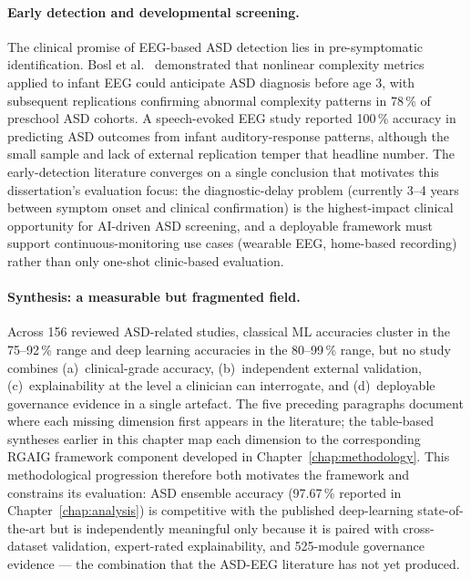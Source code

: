 \paragraph{Early detection and developmental screening.}
The clinical promise of EEG-based ASD detection lies in pre-symptomatic identification. Bosl et al.~\cite{bosl2018eeg} demonstrated that nonlinear complexity metrics applied to infant EEG could anticipate ASD diagnosis before age 3, with subsequent replications confirming abnormal complexity patterns in 78\,\% of preschool ASD cohorts. A speech-evoked EEG study reported 100\,\% accuracy in predicting ASD outcomes from infant auditory-response patterns, although the small sample and lack of external replication temper that headline number. The early-detection literature converges on a single conclusion that motivates this dissertation's evaluation focus: the diagnostic-delay problem (currently 3--4 years between symptom onset and clinical confirmation) is the highest-impact clinical opportunity for AI-driven ASD screening, and a deployable framework must support continuous-monitoring use cases (wearable EEG, home-based recording) rather than only one-shot clinic-based evaluation.

\paragraph{Synthesis: a measurable but fragmented field.}
Across 156 reviewed ASD-related studies, classical ML accuracies cluster in the 75--92\,\% range and deep learning accuracies in the 80--99\,\% range, but no study combines (a)~clinical-grade accuracy, (b)~independent external validation, (c)~explainability at the level a clinician can interrogate, and (d)~deployable governance evidence in a single artefact. The five preceding paragraphs document where each missing dimension first appears in the literature; the table-based syntheses earlier in this chapter map each dimension to the corresponding RGAIG framework component developed in Chapter~\ref{chap:methodology}. This methodological progression therefore both motivates the framework and constrains its evaluation: ASD ensemble accuracy (97.67\,\% reported in Chapter~\ref{chap:analysis}) is competitive with the published deep-learning state-of-the-art but is independently meaningful only because it is paired with cross-dataset validation, expert-rated explainability, and 525-module governance evidence --- the combination that the ASD-EEG literature has not yet produced.

